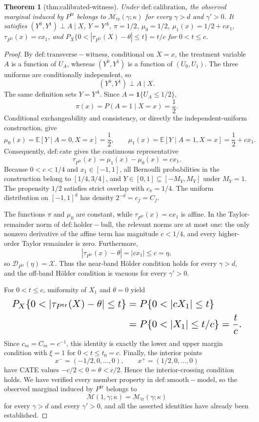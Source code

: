 \documentclass{article}
\newtheorem{theorem}{Theorem}
\begin{document}
\begin{theorem}[thm:calibrated-witness]\label{thm:calibrated-witness}
Under \(\mathrm{def:calibration}\), the observed marginal induced by \(P^{\mathrm{tr}}\) belongs to \(\mathcal M_{\mathrm{tr}}(\gamma;\kappa)\) for every \(\gamma>d\) and \(\gamma'>0\). It satisfies \((Y^0,Y^1)\perp A\mid X\), \(Y=Y^A\), \(\pi=1/2\), \(\mu_0=1/2\), \(\mu_1(x)=1/2+cx_1\), \(\tau_{P^{\mathrm{tr}}}(x)=cx_1\), and \(P_X\{0<|\tau_{P^{\mathrm{tr}}}(X)-\theta|\le t\}=t/c\) for \(0<t\le c\).
\end{theorem}
\begin{proof}
By \(\mathrm{def:transverse-witness}\), conditional on \(X=x\), the treatment variable \(A\) is a function of \(U_A\), whereas \((Y^0,Y^1)\) is a function of \((U_0,U_1)\). The three uniforms are conditionally independent, so
\[
(Y^0,Y^1)\perp A\mid X.
\]
The same definition sets \(Y=Y^A\). Since \(A=\mathbf 1\{U_A\le 1/2\}\),
\[
\pi(x)=P(A=1\mid X=x)=\frac12.
\]
Conditional exchangeability and consistency, or directly the independent-uniform construction, give
\[
\mu_0(x)=\mathbb E[Y\mid A=0,X=x]=\frac12,
\qquad
\mu_1(x)=\mathbb E[Y\mid A=1,X=x]=\frac12+cx_1.
\]
Consequently, \(\mathrm{def:cate}\) gives the continuous representative
\[
\tau_{P^{\mathrm{tr}}}(x)=\mu_1(x)-\mu_0(x)=cx_1.
\]
Because \(0<c<1/4\) and \(x_1\in[-1,1]\), all Bernoulli probabilities in the construction belong to \([1/4,3/4]\), and \(Y\in[0,1]\subseteq[-M_Y,M_Y]\) under \(M_Y=1\). The propensity \(1/2\) satisfies strict overlap with \(c_\pi=1/4\). The uniform distribution on \([-1,1]^d\) has density \(2^{-d}=c_f=C_f\).

The functions \(\pi\) and \(\mu_0\) are constant, while \(\tau_{P^{\mathrm{tr}}}(x)=cx_1\) is affine. In the Taylor-remainder norm of \(\mathrm{def:holder-ball}\), the relevant norms are at most one: the only nonzero derivative of the affine term has magnitude \(c<1/4\), and every higher-order Taylor remainder is zero. Furthermore,
\[
|\tau_{P^{\mathrm{tr}}}(x)-\theta|=|cx_1|\le c=\eta,
\]
so \(\mathcal D_{P^{\mathrm{tr}}}(\eta)=\mathcal X\). Thus the near-band Hölder condition holds for every \(\gamma>d\), and the off-band Hölder condition is vacuous for every \(\gamma'>0\).

For \(0<t\le c\), uniformity of \(X_1\) and \(\theta=0\) yield
\[
\makebox[\linewidth][c]{\resizebox{0.98\linewidth}{!}{\(\displaystyle \begin{aligned}
P_X\{0<|\tau_{P^{\mathrm{tr}}}(X)-\theta|\le t\}
&=P\{0<|cX_1|\le t\}\\
&=P\{0<|X_1|\le t/c\}
=\frac{t}{c}.
\end{aligned}\)}}
\]
Since \(c_m=C_m=c^{-1}\), this identity is exactly the lower and upper margin condition with \(\xi=1\) for \(0<t\le t_0=c\). Finally, the interior points
\[
x^-=(-1/2,0,\ldots,0),
\qquad
x^+=(1/2,0,\ldots,0)
\]
have CATE values \(-c/2<0=\theta<c/2\). Hence the interior-crossing condition holds. We have verified every member property in \(\mathrm{def:smooth-model}\), so the observed marginal induced by \(P^{\mathrm{tr}}\) belongs to
\[
\mathcal M(1,\gamma;\kappa)=\mathcal M_{\mathrm{tr}}(\gamma;\kappa)
\]
for every \(\gamma>d\) and every \(\gamma'>0\), and all the asserted identities have already been established.
\end{proof}
\end{document}
